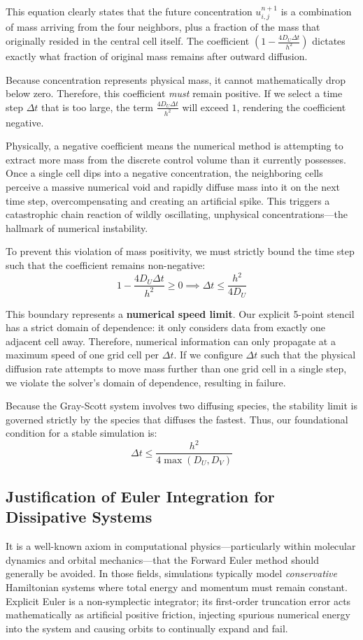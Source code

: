 \documentclass[12pt,a4paper]{article}
\begin{document}
This equation clearly states that the future concentration $u^{n+1}_{i,j}$ is a combination of mass arriving from the four neighbors, plus a fraction of the mass that originally resided in the central cell itself. The coefficient $\left( 1 - \frac{4D_U \Delta t}{h^2} \right)$ dictates exactly what fraction of original mass remains after outward diffusion.

Because concentration represents physical mass, it cannot mathematically drop below zero. Therefore, this coefficient \textit{must} remain positive. If we select a time step $\Delta t$ that is too large, the term $\frac{4D_U \Delta t}{h^2}$ will exceed $1$, rendering the coefficient negative. 

Physically, a negative coefficient means the numerical method is attempting to extract more mass from the discrete control volume than it currently possesses. Once a single cell dips into a negative concentration, the neighboring cells perceive a massive numerical void and rapidly diffuse mass into it on the next time step, overcompensating and creating an artificial spike. This triggers a catastrophic chain reaction of wildly oscillating, unphysical concentrations—the hallmark of numerical instability.

To prevent this violation of mass positivity, we must strictly bound the time step such that the coefficient remains non-negative:
$$1 - \frac{4D_U \Delta t}{h^2} \ge 0 \implies \Delta t \le \frac{h^2}{4D_U}$$

This boundary represents a \textbf{numerical speed limit}. Our explicit 5-point stencil has a strict domain of dependence: it only considers data from exactly one adjacent cell away. Therefore, numerical information can only propagate at a maximum speed of one grid cell per $\Delta t$. If we configure $\Delta t$ such that the physical diffusion rate attempts to move mass further than one grid cell in a single step, we violate the solver's domain of dependence, resulting in failure.

Because the Gray-Scott system involves two diffusing species, the stability limit is governed strictly by the species that diffuses the fastest. Thus, our foundational condition for a stable simulation is:
$$\Delta t \le \frac{h^2}{4 \max(D_U, D_V)}$$

\subsection{Justification of Euler Integration for Dissipative Systems}
It is a well-known axiom in computational physics—particularly within molecular dynamics and orbital mechanics—that the Forward Euler method should generally be avoided. In those fields, simulations typically model \textit{conservative} Hamiltonian systems where total energy and momentum must remain constant. Explicit Euler is a non-symplectic integrator; its first-order truncation error acts mathematically as artificial positive friction, injecting spurious numerical energy into the system and causing orbits to continually expand and fail.
\end{document}
